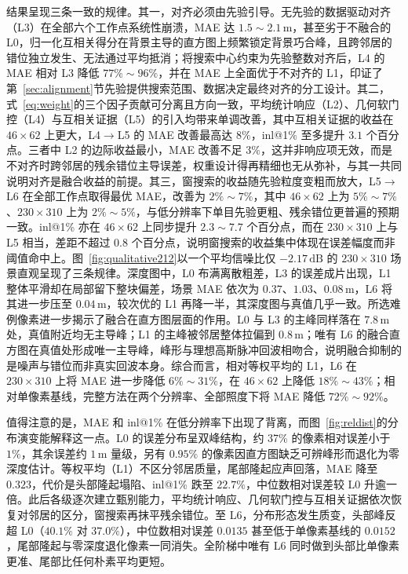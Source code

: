 结果呈现三条一致的规律。其一，对齐必须由先验引导。无先验的数据驱动对齐（L3）在全部六个工作点系统性崩溃，MAE 达 $1.5\sim2.1\,\mathrm{m}$，甚至劣于不融合的 L0，归一化互相关得分在背景主导的直方图上频繁锁定背景巧合峰，且跨邻居的错位独立发生、无法通过平均抵消；将搜索中心约束为先验整数对齐后，L4 的 MAE 相对 L3 降低 $77\%\sim96\%$，并在 MAE 上全面优于不对齐的 L1，印证了第~\ref{sec:alignment}节先验提供搜索范围、数据决定最终对齐的分工设计。其二，式~\eqref{eq:weight}的三个因子贡献可分离且方向一致，平均统计响应（L2）、几何软门控（L4）与互相关证据（L5）的引入均带来单调改善，其中互相关证据的收益在 $46\times62$ 上更大，L4$\to$L5 的 MAE 改善最高达 $8\%$，inl@1\% 至多提升 $3.1$ 个百分点。三者中 L2 的边际收益最小，MAE 改善不足 $3\%$，这并非响应项无效，而是不对齐时跨邻居的残余错位主导误差，权重设计得再精细也无从弥补，与其一共同说明对齐是融合收益的前提。其三，窗搜索的收益随先验粒度变粗而放大，L5$\to$L6 在全部工作点取得最优 MAE，改善为 $2\%\sim7\%$，其中 $46\times62$ 上为 $5\%\sim7\%$、$230\times310$ 上为 $2\%\sim5\%$，与低分辨率下单目先验更粗、残余错位更普遍的预期一致。inl@1\% 亦在 $46\times62$ 上同步提升 $2.3\sim7.7$ 个百分点，而在 $230\times310$ 上与 L5 相当，差距不超过 $0.8$ 个百分点，说明窗搜索的收益集中体现在误差幅度而非阈值命中上。图~\ref{fig:qualitative212}以一个平均信噪比仅 $-2.17\,\mathrm{dB}$ 的 $230\times310$ 场景直观呈现了三条规律。深度图中，L0 布满离散粗差，L3 的误差成片出现，L1 整体平滑却在局部留下整块偏差，场景 MAE 依次为 $0.37$、$1.03$、$0.08\,\mathrm{m}$，L6 将其进一步压至 $0.04\,\mathrm{m}$，较次优的 L1 再降一半，其深度图与真值几乎一致。所选难例像素进一步揭示了融合在直方图层面的作用。L0 与 L3 的主峰同样落在 $7.8\,\mathrm{m}$ 处，真值附近均无主导峰；L1 的主峰被邻居整体拉偏到 $0.8\,\mathrm{m}$；唯有 L6 的融合直方图在真值处形成唯一主导峰，峰形与理想高斯脉冲回波相吻合，说明融合抑制的是噪声与错位而非真实回波本身。综合而言，相对等权平均的 L1，L6 在 $230\times310$ 上将 MAE 进一步降低 $6\%\sim31\%$，在 $46\times62$ 上降低 $18\%\sim43\%$；相对单像素基线，完整方法在两个分辨率、全部照度下将 MAE 降低 $72\%\sim92\%$。

值得注意的是，MAE 和 inl@1\% 在低分辨率下出现了背离，而图~\ref{fig:reldist}的分布演变能解释这一点。L0 的误差分布呈双峰结构，约 37\% 的像素相对误差小于 $1\%$，其余误差约 $1\,\mathrm{m}$ 量级，另有 $0.95\%$ 的像素因直方图缺乏可辨峰形而退化为零深度估计。等权平均（L1）不区分邻居质量，尾部隆起应声回落，MAE 降至 $0.323$，代价是头部隆起塌陷、inl@1\% 跌至 $22.7\%$，中位数相对误差较 L0 升逾一倍。此后各级逐次建立甄别能力，平均统计响应、几何软门控与互相关证据依次恢复对邻居的区分，窗搜索再抹平残余错位。至 L6，分布形态发生质变，头部峰反超 L0（$40.1\%$ 对 $37.0\%$），中位数相对误差 $0.0135$ 甚至低于单像素基线的 $0.0152$，尾部隆起与零深度退化像素一同消失。全阶梯中唯有 L6 同时做到头部比单像素更准、尾部比任何朴素平均更短。
